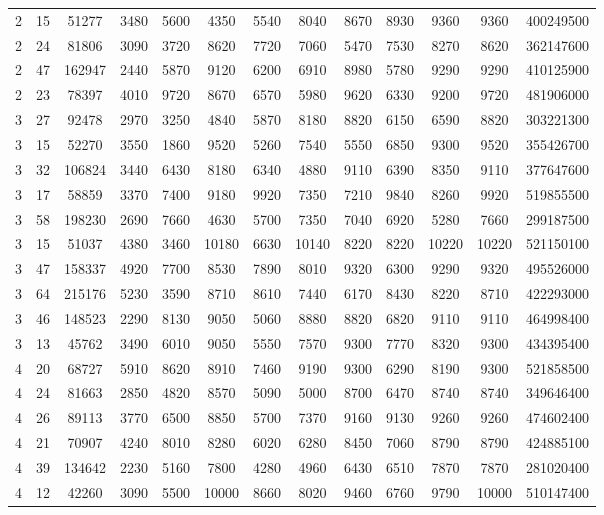 \documentclass[journal]{IEEEtran}
\begin{document}
\begin{table}
\begin{tabular}{|ccc|cccccccc|cc|}
2	&	15	&	51277	&	3480	&	5600	&	4350	&	5540	&	8040	&	8670	&	8930	&	9360	&	9360	&	400249500	\\
2	&	24	&	81806	&	3090	&	3720	&	8620	&	7720	&	7060	&	5470	&	7530	&	8270	&	8620	&	362147600	\\
2	&	47	&	162947	&	2440	&	5870	&	9120	&	6200	&	6910	&	8980	&	5780	&	9290	&	9290	&	410125900	\\
2	&	23	&	78397	&	4010	&	9720	&	8670	&	6570	&	5980	&	9620	&	6330	&	9200	&	9720	&	481906000	\\
\hline																				
3	&	27	&	92478	&	2970	&	3250	&	4840	&	5870	&	8180	&	8820	&	6150	&	6590	&	8820	&	303221300	\\
3	&	15	&	52270	&	3550	&	1860	&	9520	&	5260	&	7540	&	5550	&	6850	&	9300	&	9520	&	355426700	\\
3	&	32	&	106824	&	3440	&	6430	&	8180	&	6340	&	4880	&	9110	&	6390	&	8350	&	9110	&	377647600	\\
3	&	17	&	58859	&	3370	&	7400	&	9180	&	9920	&	7350	&	7210	&	9840	&	8260	&	9920	&	519855500	\\
3	&	58	&	198230	&	2690	&	7660	&	4630	&	5700	&	7350	&	7040	&	6920	&	5280	&	7660	&	299187500	\\
3	&	15	&	51037	&	4380	&	3460	&	10180	&	6630	&	10140	&	8220	&	8220	&	10220	&	10220	&	521150100	\\
3	&	47	&	158337	&	4920	&	7700	&	8530	&	7890	&	8010	&	9320	&	6300	&	9290	&	9320	&	495526000	\\
3	&	64	&	215176	&	5230	&	3590	&	8710	&	8610	&	7440	&	6170	&	8430	&	8220	&	8710	&	422293000	\\
3	&	46	&	148523	&	2290	&	8130	&	9050	&	5060	&	8880	&	8820	&	6820	&	9110	&	9110	&	464998400	\\
3	&	13	&	45762	&	3490	&	6010	&	9050	&	5550	&	7570	&	9300	&	7770	&	8320	&	9300	&	434395400	\\
\hline																				
4	&	20	&	68727	&	5910	&	8620	&	8910	&	7460	&	9190	&	9300	&	6290	&	8190	&	9300	&	521858500	\\
4	&	24	&	81663	&	2850	&	4820	&	8570	&	5090	&	5000	&	8700	&	6470	&	8740	&	8740	&	349646400	\\
4	&	26	&	89113	&	3770	&	6500	&	8850	&	5700	&	7370	&	9160	&	9130	&	9260	&	9260	&	474602400	\\
4	&	21	&	70907	&	4240	&	8010	&	8280	&	6020	&	6280	&	8450	&	7060	&	8790	&	8790	&	424885100	\\
4	&	39	&	134642	&	2230	&	5160	&	7800	&	4280	&	4960	&	6430	&	6510	&	7870	&	7870	&	281020400	\\
4	&	12	&	42260	&	3090	&	5500	&	10000	&	8660	&	8020	&	9460	&	6760	&	9790	&	10000	&	510147400	\\

\end{tabular}
\end{table}
\end{document}
